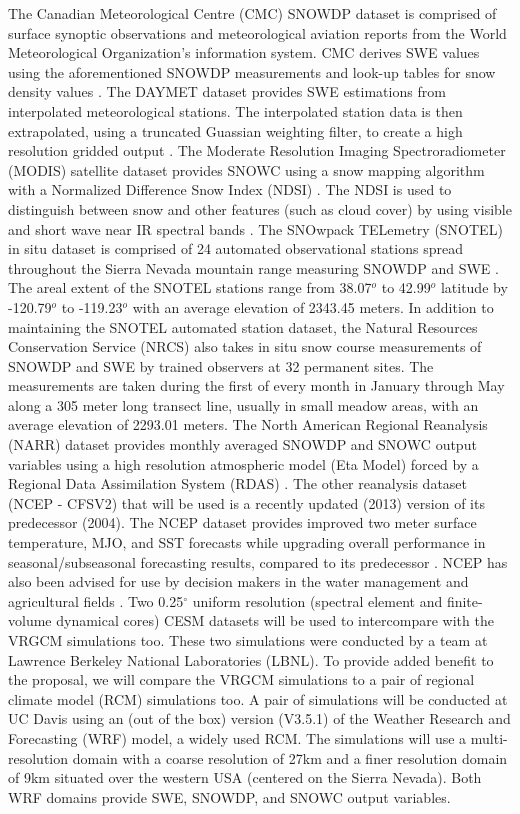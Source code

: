 \documentclass[11pt]{article}
\begin{document}
The Canadian Meteorological Centre (CMC) SNOWDP dataset is comprised of surface synoptic observations and meteorological aviation reports from the World Meteorological Organization’s information system.  CMC derives SWE values using the aforementioned SNOWDP measurements and look-up tables for snow density values \citep{brown2003gridded}.  The DAYMET dataset provides SWE estimations from interpolated meteorological stations.  The interpolated station data is then extrapolated, using a truncated Guassian weighting filter, to create a high resolution gridded output \citep{thornton2012daymet}.  The Moderate Resolution Imaging Spectroradiometer (MODIS) satellite dataset provides SNOWC using a snow mapping algorithm with a Normalized Difference Snow Index (NDSI) \citep{salomonson2006development}.  The NDSI is used to distinguish between snow and other features (such as cloud cover) by using visible and short wave near IR spectral bands \citep{salomonson2006development}.  The SNOwpack TELemetry (SNOTEL) in situ dataset is comprised of 24 automated observational stations spread throughout the Sierra Nevada mountain range measuring SNOWDP and SWE \citep{serreze1999characteristics}.  The areal extent of the SNOTEL stations range from 38.07$^{o}$ to 42.99$^{o}$ latitude by -120.79$^{o}$ to -119.23$^{o}$ with an average elevation of 2343.45 meters.  In addition to maintaining the SNOTEL automated station dataset, the Natural Resources Conservation Service (NRCS) also takes in situ snow course measurements of SNOWDP and SWE by trained observers at 32 permanent sites.  The measurements are taken during the first of every month in January through May along a 305 meter long transect line, usually in small meadow areas, with an average elevation of 2293.01 meters.  The North American Regional Reanalysis (NARR) dataset provides monthly averaged SNOWDP and SNOWC output variables using a high resolution atmospheric model (Eta Model) forced by a Regional Data Assimilation System (RDAS) \citep{mesinger2006north}.  The other reanalysis dataset (NCEP - CFSV2) that will be used is a recently updated (2013) version of its predecessor (2004).  The NCEP dataset provides improved two meter surface temperature, MJO, and SST forecasts while upgrading overall performance in seasonal/subseasonal forecasting results, compared to its predecessor \citep{saha2014ncep}. NCEP has also been advised for use by decision makers in the water management and agricultural fields \citep{saha2014ncep}.  Two 0.25$^\circ$ uniform resolution (spectral element and finite-volume dynamical cores) CESM datasets will be used to intercompare with the VRGCM simulations too.  These two simulations were conducted by a team at Lawrence Berkeley National Laboratories (LBNL). To provide added benefit to the proposal, we will compare the VRGCM simulations to a pair of regional climate model (RCM) simulations too.  A pair of simulations will be conducted at UC Davis using an (out of the box) version (V3.5.1) of the Weather Research and Forecasting (WRF) model, a widely used RCM.  The simulations will use a multi-resolution domain with a coarse resolution of 27km and a finer resolution domain of 9km situated over the western USA (centered on the Sierra Nevada).  Both WRF domains provide SWE, SNOWDP, and SNOWC output variables.
\end{document}
